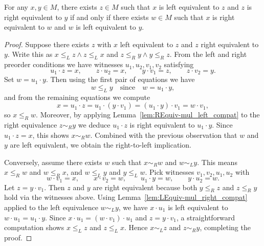 \begin{lemma}
\label{lem:rEquiv_lEquiv_comm}
For any \(x,y \in M\), there exists \(z\in M\) such that \(x\) is left equivalent to \(z\) and \(z\) is right equivalent to \(y\) if and only if there exists \(w\in M\) such that \(x\) is right equivalent to \(w\) and \(w\) is left equivalent to \(y\).
\leanok
{}
\end{lemma}
\begin{proof}
\leanok
Suppose there exists \(z\) with \(x\) left equivalent to \(z\) and \(z\) right equivalent to \(y\).  Write this as \(x \le_L z \land z \le_L x\) and \(z \le_R y \land y \le_R z\).  From the left and right preorder conditions we have witnesses \(u_1,u_2,v_1,v_2\) satisfying
\[
  u_1\cdot z = x,\qquad z\cdot u_2 = x,\qquad y\cdot v_1 = z,\qquad z\cdot v_2 = y.
\]
Set \(w = u_1\cdot y\).  Then using the first pair of equations we have
\[
  w \le_L y \quad\text{since}\quad w = u_1\cdot y,
\]
and from the remaining equations we compute
\[
  x = u_1\cdot z = u_1\cdot (y\cdot v_1) = (u_1\cdot y)\cdot v_1 = w\cdot v_1,
\]
so \(x \le_R w\).  Moreover, by applying Lemma~\ref{lem:REquiv-mul_left_compat} to the right equivalence \(z \sim_R y\) we deduce \(u_1\cdot z\) is right equivalent to \(u_1\cdot y\).  Since \(u_1\cdot z = x\), this shows \(x \sim_R w\).  Combined with the previous observation that \(w\) and \(y\) are left equivalent, we obtain the right-to-left implication.

Conversely, assume there exists \(w\) such that \(x\sim_R w\) and \(w\sim_L y\).  This means \(x \le_R w\) and \(w \le_R x\), and \(w \le_L y\) and \(y \le_L w\).  Pick witnesses \(v_1,v_2,u_1,u_2\) with
\[
  w\cdot v_1 = x,\qquad x\cdot v_2 = w,\qquad u_1\cdot y = w,\qquad y\cdot u_2 = w.
\]
Let \(z = y\cdot v_1\).  Then \(z\) and \(y\) are right equivalent because both \(y \le_R z\) and \(z \le_R y\) hold via the witnesses above.  Using Lemma~\ref{lem:LEquiv-mul_right_compat} applied to the left equivalence \(w \sim_L y\), we have \(x\cdot u_1\) is left equivalent to \(w\cdot u_1 = u_1\cdot y\).  Since \(x\cdot u_1 = (w\cdot v_1)\cdot u_1\) and \(z = y\cdot v_1\), a straightforward computation shows \(x \le_L z\) and \(z \le_L x\).  Hence \(x\sim_L z\) and \(z\sim_R y\), completing the proof.
\end{proof}
